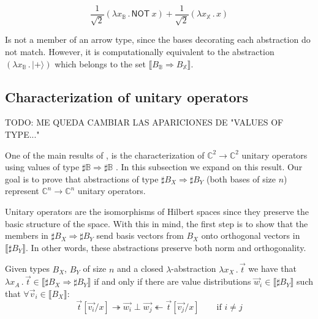\documentclass[runningheads,orivec]{llncs}
\newcommand\ket[1]{\ensuremath{|#1\rangle}}
\def\C{\mathbb{C}}            %
\def\Lam#1#2#3{\lambda#1_{#2}\,{.}\,#3} %
\def\eval{\twoheadrightarrow}
\def\Arr{\Rightarrow}
\def\sem#1{\llbracket#1\rrbracket}
\newcommand\B{\mathbb B}
\newcommand\XB{\mathbb X}
\newcommand{\pauliX}[1]{\mathsf{NOT}\ #1}
\newcommand\basis[1]{\ensuremath{B_{ #1 }}}
\begin{document}
\[
\frac{1}{\sqrt{2}}(\Lam{x}{\B}{\pauliX{x}}) + \frac{1}{\sqrt{2}}(\Lam{x}{\XB}{x})
\]

Is not a member of an arrow type, since the bases decorating each abstraction do not match. However, it is computationally equivalent to the abstraction $(\Lam{x}{\B}{\ket{+}})$ which belongs to the set $\sem{\basis{\B}\Arr\basis{\XB}}$.

\subsection{Characterization of unitary operators}

{\color{red}TODO: ME QUEDA CAMBIAR LAS APARICIONES DE "VALUES OF TYPE..."}

One of the main results of \cite{DiazcaroGuillermoMiquelValironLICS19}, is the characterization of $\C^2\to\C^2$ unitary operators using values of type $\sharp\B\Arr\sharp\B$ \cite[Theorem IV.12]{DiazcaroGuillermoMiquelValironLICS19}. In this subsection we expand on this result. Our goal is to prove that abstractions of type $\sharp\basis{X}\Arr\sharp\basis{Y}$ (both bases of size $n$) represent $\C^n\to\C^n$ unitary operators.

Unitary operators are the isomorphisms of Hilbert spaces since they preserve the basic structure of the space. With this in mind, the first step is to show that the members in $\sharp\basis{X}\Arr\sharp{\basis{Y}}$ send basis vectors from $\basis{X}$ onto orthogonal vectors in $\sem{\sharp\basis{Y}}$. In other words, these abstractions preserve both norm and orthogonality.

\begin{lemma}\label{lem:BasesIso}
  Given types $\basis{X}$, $\basis{Y}$ of size $n$ and a closed $\lambda$-abstraction $\Lam{x}{X}{\vec t}$ we have that $\Lam{x}{A}{\vec t}\in\sem{\sharp\basis{X}\Arr\sharp\basis{Y}}$ if and only if there are value distributions $\vec w_i\in\sem{\sharp\basis{Y}}$ such that $\forall\vec v_i\in\sem{\basis{X}}$:
  \[
    \vec{t}[\vec{v_i}/x]\eval\vec{w_i}\perp\vec{w_j}\twoheadleftarrow \vec{t}[\vec{v_j}/x] \qquad \text{if } i\neq j
  \]
\end{lemma}
\end{document}
